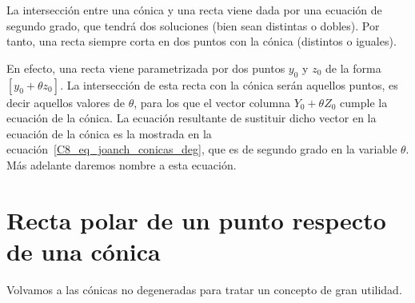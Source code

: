 \begin{obs}
	\label{C8_obs_conica_recta_interseccion2puntos}
	La intersección entre una cónica y una recta viene dada por una ecuación de segundo grado, que tendrá dos soluciones (bien sean distintas o dobles). Por tanto, una recta siempre corta en dos puntos con la cónica (distintos o iguales).
	
	En efecto, una recta viene parametrizada por dos puntos $y_0$ y $z_0$ de la forma $[y_0+\theta z_0]$. La intersección de esta recta con la cónica serán aquellos puntos, es decir aquellos valores de $\theta$, para los que el vector columna $Y_0+\theta Z_0$ cumple la ecuación de la cónica. La ecuación resultante de sustituir dicho vector en la ecuación de la cónica es la mostrada en la ecuación~\eqref{C8_eq_joanch_conicas_deg}, que es de segundo grado en la variable $\theta$. Más adelante daremos nombre a esta ecuación.
\end{obs}

\section{Recta polar de un punto respecto de una cónica}
Volvamos a las cónicas no degeneradas para tratar un concepto de gran utilidad.

